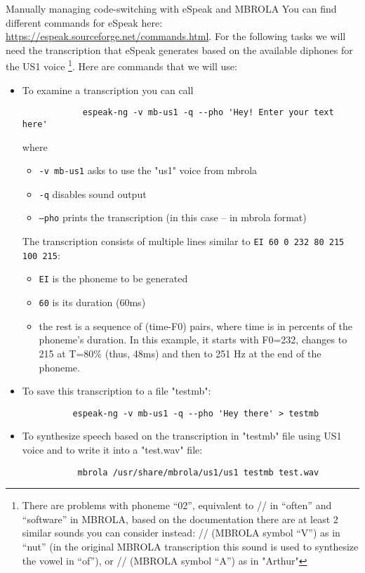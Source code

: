 \documentclass{../labbook}
\begin{document}
\begin{problem}{2}{7}{Manually managing code-switching with eSpeak and MBROLA}
You can find different commands for eSpeak here: \href{https://espeak.sourceforge.net/commands.html}{https://espeak.sourceforge.net/commands.html}.
For the following tasks we will need the transcription that eSpeak generates based on the available diphones for the US1 voice \footnote{There are problems with phoneme ``02'', equivalent to // in “often” and “software” in MBROLA, based on the documentation there are at least 2 similar sounds you can consider instead: // (MBROLA symbol “V”) as in “nut” (in the original MBROLA transcription this sound is used to synthesize the vowel in “of”), or // (MBROLA symbol “A”) as in "Arthur"}. 
Here are commands that we will use:
\begin{itemize}
    \item To examine a transcription you can call 
        \begin{verbatim} 
            espeak-ng -v mb-us1 -q --pho 'Hey! Enter your text here'
        \end{verbatim} where 
        \begin{itemize}
            \item \texttt{-v mb-us1} asks to use the "us1" voice from mbrola
            \item \texttt{-q} disables sound output
            \item  \texttt{--pho} prints the transcription (in this case -- in mbrola format)
        \end{itemize}
                
      
      The transcription consists of multiple lines similar to \texttt{EI	60	 0 232 80 215 100 215}:
      \begin{itemize}
          \item \texttt{EI} is the phoneme to be generated
          \item \texttt{60} is its duration (60ms)
          \item the rest is a sequence of (time-F0) pairs, where time is in percents of the phoneme's duration. In this example, it starts with F0=232, changes to 215 at T=80\% (thus, 48ms) and then to 251 Hz at the end of the phoneme.
      \end{itemize}

    \item To save this transcription to a file "testmb":
          \begin{verbatim}
          espeak-ng -v mb-us1 -q --pho 'Hey there' > testmb  
          \end{verbatim}
    \item To synthesize speech based on the transcription in "testmb" file using          US1 voice and to write it into a "test.wav" file:
          \begin{verbatim}
           mbrola /usr/share/mbrola/us1/us1 testmb test.wav   
          \end{verbatim}
\end{itemize}
    

\end{problem}
\end{document}
